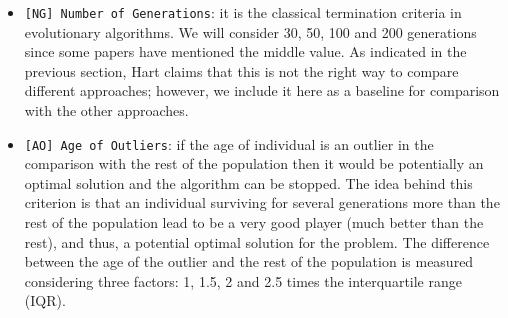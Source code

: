 \documentclass[runningheads,a4paper]{llncs}
\begin{document}
\begin{itemize}
    \item \texttt{[NG] Number of Generations}: it is the classical termination
      criteria in evolutionary algorithms. We will consider 30, 50, 100 and 200 generations since some papers \cite{EvoStar2014:GPBot} have mentioned the middle value. As indicated in the previous section,
      Hart \cite{Hart1996} claims that this is not the right way to
      compare different approaches; however, we include it here as a
      baseline for comparison with the other approaches. %

    \item \texttt{[AO] Age of Outliers}: if the age of individual is an outlier in the comparison with the rest of the population then it would be potentially an optimal solution and the algorithm can be stopped. %
The idea behind this criterion is that an individual surviving for several generations more than the rest of the population lead to be a very good player (much better than the rest), and thus, a potential optimal solution for the problem. The difference between the age of the outlier and the rest of the population is measured considering three factors: 1, 1.5, 2 and 2.5 times the interquartile range (IQR). %


\end{itemize}
\end{document}
